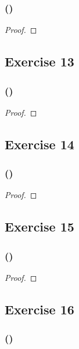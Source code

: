 \documentclass[14pt]{extarticle}
\begin{document}
\subsubsection{()}

\begin{proof}

\end{proof}

\subsection{Exercise 13}

\subsubsection{()}

\begin{proof}

\end{proof}

\subsection{Exercise 14}

\subsubsection{()}

\begin{proof}

\end{proof}

\subsection{Exercise 15}

\subsubsection{()}

\begin{proof}

\end{proof}

\subsection{Exercise 16}

\subsubsection{()}
\end{document}
